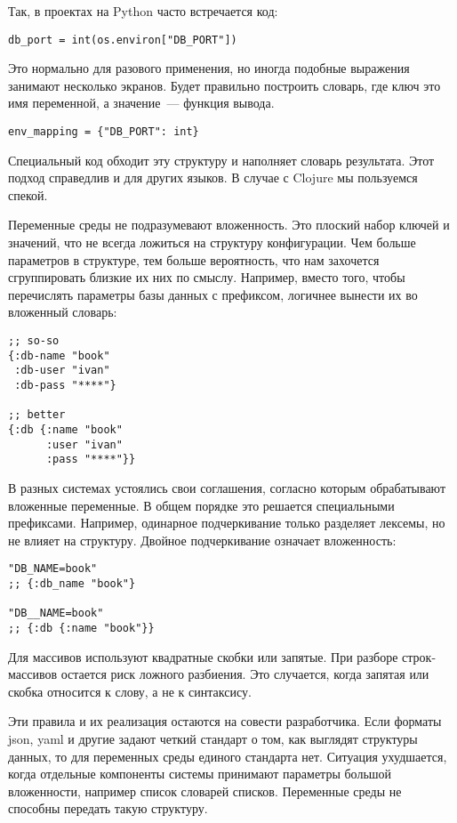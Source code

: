 Так, в проектах на Python часто встречается код:

\begin{verbatim}
db_port = int(os.environ["DB_PORT"])
\end{verbatim}

Это нормально для разового применения, но иногда подобные выражения занимают
несколько экранов. Будет правильно построить словарь, где ключ это имя
переменной, а значение~--- функция вывода.

\begin{verbatim}
env_mapping = {"DB_PORT": int}
\end{verbatim}

Специальный код обходит эту структуру и наполняет словарь результата. Этот
подход справедлив и для других языков. В случае с Clojure мы пользуемся спекой.

Переменные среды не подразумевают вложенность. Это плоский набор ключей и
значений, что не всегда ложиться на структуру конфигурации. Чем больше
параметров в структуре, тем больше вероятность, что нам захочется сгруппировать
близкие их них по смыслу. Например, вместо того, чтобы перечислять параметры
базы данных с префиксом, логичнее вынести их во вложенный словарь:

\begin{verbatim}
;; so-so
{:db-name "book"
 :db-user "ivan"
 :db-pass "****"}

;; better
{:db {:name "book"
      :user "ivan"
      :pass "****"}}
\end{verbatim}

В разных системах устоялись свои соглашения, согласно которым обрабатывают
вложенные переменные. В общем порядке это решается специальными
префиксами. Например, одинарное подчеркивание только разделяет лексемы, но не
влияет на структуру. Двойное подчеркивание означает вложенность:

\begin{verbatim}
"DB_NAME=book"
;; {:db_name "book"}

"DB__NAME=book"
;; {:db {:name "book"}}
\end{verbatim}

Для массивов используют квадратные скобки или запятые. При разборе
строк-массивов остается риск ложного разбиения. Это случается, когда запятая или
скобка относится к слову, а не к синтаксису.

Эти правила и их реализация остаются на совести разработчика. Если форматы json,
yaml и другие задают четкий стандарт о том, как выглядят структуры данных, то
для переменных среды единого стандарта нет. Ситуация ухудшается, когда отдельные
компоненты системы принимают параметры большой вложенности, например список
словарей списков. Переменные среды не способны передать такую структуру.

